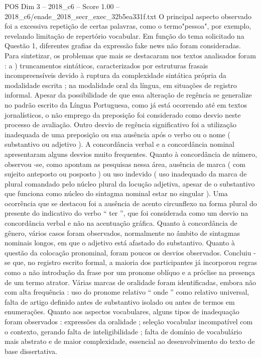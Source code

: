 \begin{textsample}{POS Dim 3 – 2018\_c6 – Score 1.00 – 2018\_c6/enade\_2018\_secr\_exec\_32b5ea331f.txt}
O principal aspecto observado foi a excessiva repetição de certas palavras, como o termo"pessoa", por exemplo, revelando limitação de repertório vocabular.
Em função do tema solicitado na Questão 1, diferentes grafias da expressão fake news não foram consideradas.
Para sintetizar, os problemas que mais se destacaram nos textos analisados foram : a ) truncamentos sintáticos, caracterizados por estruturas frasais incompreensíveis devido à ruptura da complexidade sintática própria da modalidade escrita ; na modalidade oral da língua, em situações de registro informal.
Apesar da possibilidade de que essa alteração de regência se generalize no padrão escrito da Língua Portuguesa, como já está ocorrendo até em textos jornalísticos, o não emprego da preposição foi considerado como desvio neste processo de avaliação.
Outro desvio de regência significativo foi a utilização inadequada de uma preposição ou sua ausência após o verbo ou o nome ( substantivo ou adjetivo ).
A concordância verbal e a concordância nominal apresentaram alguns desvios muito frequentes.
Quanto à concordância de número, observou -se, como apontam as pesquisas nessa área, ausência de marca ( com sujeito anteposto ou posposto ) ou uso indevido ( uso inadequado da marca de plural comandado pelo núcleo plural da locução adjetiva, apesar de o substantivo que funciona como núcleo do sintagma nominal estar no singular ).
Uma ocorrência que se destacou foi a ausência de acento circunflexo na forma plural do presente do indicativo do verbo “ ter ”, que foi considerada como um desvio na concordância verbal e não na acentuação gráfica.
Quanto à concordância de gênero, vários casos foram observados, normalmente no âmbito de sintagmas nominais longos, em que o adjetivo está afastado do substantivo.
Quanto à questão da colocação pronominal, foram poucos os desvios observados.
Concluiu -se que, no registro escrito formal, a maioria dos participantes já incorporou regras como a não introdução da frase por um pronome oblíquo e a próclise na presença de um termo atrator.
Várias marcas de oralidade foram identificadas, embora não com alta frequência : uso do pronome relativo “ onde ” como relativo universal, falta de artigo definido antes de substantivo isolado ou antes de termos em enumerações.
Quanto aos aspectos vocabulares, alguns tipos de inadequação foram observados : expressões da oralidade ; seleção vocabular incompatível com o contexto, gerando falta de inteligibilidade ; falta de domínio de vocabulário mais abstrato e de maior complexidade, essencial ao desenvolvimento do texto de base dissertativa.

\end{textsample}

